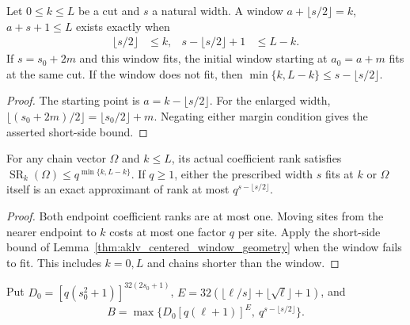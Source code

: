 \begin{lemma}
    \label{thm:aklv_centered_window_geometry}
    \leanok
    Let $0\le k\le L$ be a cut and $s$ a natural width. A window
    $a+\lfloor s/2\rfloor=k$, $a+s+1\le L$ exists exactly when
    \begin{align*}
        \lfloor s/2\rfloor     & \le k,   &
        s-\lfloor s/2\rfloor+1 & \le L-k.
    \end{align*}
    If $s=s_0+2m$ and this window fits, the initial window starting at
    $a_0=a+m$ fits at the same cut.
    If the window does not fit, then
    $\min\{k,L-k\}\le s-\lfloor s/2\rfloor$.
\end{lemma}
\begin{proof}
    \leanok
    The starting point is $a=k-\lfloor s/2\rfloor$.
    For the enlarged width,
    $\lfloor(s_0+2m)/2\rfloor=\lfloor s_0/2\rfloor+m$.
    Negating either margin condition gives the asserted short-side bound.
\end{proof}

\begin{lemma}
    \label{thm:aklv_exact_boundary_rank}
    \leanok
    For any chain vector $\Omega$ and $k\le L$, its actual coefficient
    rank satisfies $\operatorname{SR}_k(\Omega)\le q^{\min\{k,L-k\}}$.
    If $q\ge1$, either the prescribed width $s$ fits at $k$ or
    $\Omega$ itself is an exact approximant of rank at most
    $q^{s-\lfloor s/2\rfloor}$.
\end{lemma}
\begin{proof}
    \leanok
    Both endpoint coefficient ranks are at most one. Moving sites from
    the nearer endpoint to $k$ costs at most one factor $q$ per site.
    Apply the short-side bound of
    Lemma~\ref{thm:aklv_centered_window_geometry} when the window fails
    to fit. This includes $k=0,L$ and chains shorter than the window.
\end{proof}

\begin{definition}
    \label{def:aklv_accuracy_rank_budget}
    \leanok
    Put $D_0=[q(s_0^2+1)]^{32(2s_0+1)}$,
    $E=32(\lfloor\ell/s\rfloor+\lfloor\sqrt\ell\rfloor+1)$, and
    \begin{align*}
        B=\max\{D_0[q(\ell+1)]^E,\ q^{s-\lfloor s/2\rfloor}\}.
    \end{align*}
\end{definition}

